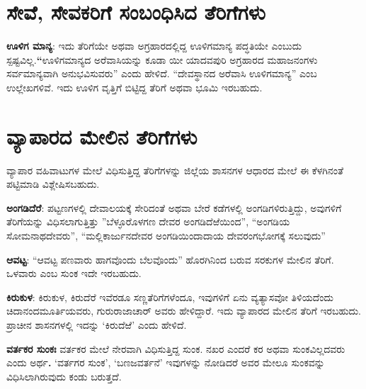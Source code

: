 \section{ಸೇವೆ, ಸೇವಕರಿಗೆ ಸಂಬಂಧಿಸಿದ ತೆರಿಗೆಗಳು}

\textbf{ಊಳಿಗ ಮಾನ್ಯ}: ಇದು ತೆರಿಗೆಯೇ ಅಥವಾ ಅಗ್ರಹಾರದಲ್ಲಿದ್ದ ಊಳಿಗಮಾನ್ಯ ಪದ್ಧತಿಯೇ ಎಂಬುದು ಸ್ಪಷ್ಟವಿಲ್ಲ.\textbf{“}ಊಳಿಗಮಾನ್ಯದ ಅರೆವಾಸಿಯನ್ನು ಕೂಡಾ ಯೀ ಯಾದವಪುರಿ ಅಗ್ರಹಾರದ ಮಹಾಜನಂಗಳು ಸರ್ವಮಾನ್ಯವಾಗಿ ಅನುಭವಿಸುವರು” ಎಂದು ಹೇಳಿದೆ. “ದೇವಸ್ಥಾನದ ಅರೆವಾಸಿ ಊಳಿಗಮಾನ್ಯ” ಎಂಬ ಉಲ್ಲೇಖಗಳಿವೆ. ಇದು ಊಳಿಗ ವೃತ್ತಿಗೆ ಬಿಟ್ಟಿದ್ದ ತೆರಿಗೆ ಅಥವಾ ಭೂಮಿ ಇರಬಹುದು.


\section{ವ್ಯಾಪಾರದ ಮೇಲಿನ ತೆರಿಗೆಗಳು}

ವ್ಯಾಪಾರ ವಹಿವಾಟುಗಳ ಮೇಲೆ ವಿಧಿಸುತ್ತಿದ್ದ ತೆರಿಗೆಗಳನ್ನು ಜಿಲ್ಲೆಯ ಶಾಸನಗಳ ಆಧಾರದ ಮೇಲೆ ಈ ಕೆಳಗಿನಂತೆ ಪಟ್ಟಿಮಾಡಿ ವಿಶ್ಲೇಷಿಸಬಹುದು.

\textbf{ಅಂಗಡಿದೆರೆ}: ಪಟ್ಟಣಗಳಲ್ಲಿ ದೇವಾಲಯಕ್ಕೆ ಸೇರಿದಂತೆ ಅಥವಾ ಬೇರೆ ಕಡೆಗಳಲ್ಲಿ ಅಂಗಡಿಗಳಿರುತ್ತಿದ್ದು, ಅವುಗಳಿಗೆ ತೆರಿಗೆಯನ್ನು ವಿಧಿಸಲಾಗುತ್ತಿತ್ತು ”ಬೆಳ್ಳೂರೊಳಗಣ ದೇವರ ಅಂಗಡಿದೆಱೆಯಿಂದ”, “ಅಂಗಡಿಯ ಸೋಮನಾಥದೇವರು”, “ಮಲ್ಲಿಕಾರ್ಜುನದೇವರ ಅಂಗಡಿಯಿಂದಾದಾಯ ದೇವರಂಗಭೋಗಕ್ಕೆ ಸಲುವುದು”

\textbf{ಆವಟ್ಟ}: “ಆವಟ್ಟ ಪಣವಾರು ಹಾಗವೊಂದು ಬೆಲವೊಂದು” ಹೊರಗಿನಿಂದ ಬರುವ ಸರಕುಗಳ ಮೇಲಿನ ತೆರಿಗೆ. ಒಳವಾರು ಎಂಬ ಸುಂಕ ಇದೇ ಇರಬಹುದು.

\textbf{ಕಿರುಕುಳ}: ಕಿರುಕುಳ, ಕಿರುದೆರೆ ಇವೆರಡೂ ಸಣ್ಣತೆರಿಗೆಗಳೆಂದೂ, ಇವುಗಳಿಗೆ ಏನು ವ್ಯತ್ಯಾಸವೋ ತಿಳಿಯದೆಂದು ಚಿದಾನಂದಮೂರ್ತಿಯವರು, ಗುರುರಾಜಾಚಾರ್​ ಅವರು ಹೇಳಿದ್ದಾರೆ. ಇದು ವ್ಯಾಪಾರದ ಮೇಲಿನ ತೆರಿಗೆ ಇರಬಹುದು. ಪ್ರಾಚೀನ ಶಾಸನಗಳಲ್ಲಿ ಇದನ್ನು ‘ಕಿರುದೆಱೆ’ ಎಂದು ಹೇಳಿದೆ.

\textbf{ವರ್ತಕರ ಸುಂಕಃ } ವರ್ತಕರ ಮೇಲೆ ನೇರವಾಗಿ ವಿಧಿಸುತ್ತಿದ್ದ ಸುಂಕ. ನಖರ ಎಂದರೆ ಕರ ಅಥವಾ ಸುಂಕವಿಲ್ಲದವರು ಎಂದು ಅರ್ಥ\textbf{. }‘ವರ್ತಗರ ಸುಂಕ’, ‘ಬಣಜವರ್ತನೆ’ ಇವುಗಳನ್ನು ನೋಡಿದರೆ ಅವರ ಮೇಲೂ ಸುಂಕವನ್ನು ವಿಧಿಸಿಲಾಗಿರುವುದು ಕಂಡು ಬರುತ್ತದೆ.


